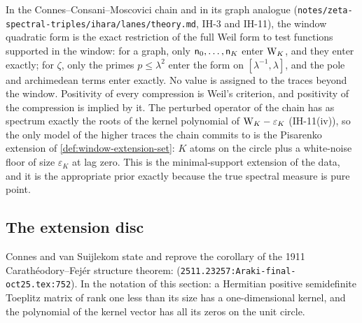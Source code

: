 \begin{observation}
\label{obs:window-is-compression}
In the Connes--Consani--Moscovici chain and in its graph analogue
(\texttt{notes/zeta-spectral-triples/ihara/lanes/theory.md}, IH-3 and IH-11), the window
quadratic form is the exact restriction of the full Weil form to test functions supported in the
window: for a graph, only $\mathsf n_{0},\dots,\mathsf n_{K}$ enter $\mathrm{W}_K$, and they enter exactly;
for $\zeta$, only the primes $p\le\lambda^2$ enter the form on $[\lambda^{-1},\lambda]$, and the
pole and archimedean terms enter exactly. No value is assigned to the traces beyond the window.
Positivity of every compression is Weil's criterion, and positivity of the compression is
implied by it. The perturbed operator of the chain has as spectrum exactly the roots of the kernel
polynomial of $\mathrm{W}_K - \varepsilon_K$ (IH-11(iv)), so the only model of the higher traces the
chain commits to is the Pisarenko extension of \cref{def:window-extension-set}: $K$ atoms on the
circle plus a white-noise floor of size $\varepsilon_K$ at lag zero. This is the minimal-support
extension of the data, and it is the appropriate prior exactly because the true spectral measure
is pure point.
\end{observation}

\subsection{The extension disc}

\begin{citedfact}
\label{cit:cf-kernel-circle}
\sloppy
Connes and van Suijlekom \cite{connes2025quadratic} state and reprove the corollary of the 1911
Carath\'eodory--Fej\'er structure theorem:
{\small\texttt{}}
(\texttt{2511.23257:Araki-final-oct25.tex:752}). In the notation of this section: a Hermitian
positive semidefinite Toeplitz matrix of rank one less than its size has a one-dimensional kernel,
and the polynomial of the kernel vector has all its zeros on the unit circle.
\end{citedfact}

